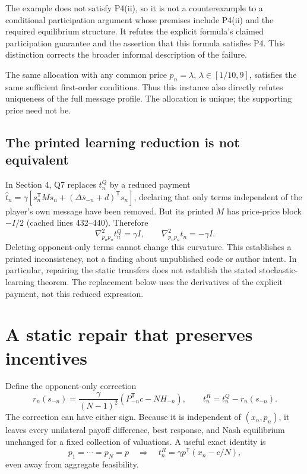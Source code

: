 \documentclass[11pt,a4paper]{article}
\begin{document}
The example does not satisfy P4(ii), so it is not a counterexample to a
conditional participation argument whose premises include P4(ii) and the
required equilibrium structure. It refutes the explicit formula's claimed
participation guarantee and the assertion that this formula satisfies P4.
This distinction corrects the broader informal description of the failure.

The same allocation with any common price $p_n=\lambda$,
$\lambda\in[1/10,9]$, satisfies the same sufficient first-order conditions.
Thus this instance also directly refutes uniqueness of the full message
profile. The allocation is unique; the supporting price need not be.

\subsection{The printed learning reduction is not equivalent}

In Section 4, Q7 replaces $t_n^Q$ by a reduced payment
$\widehat t_n=\gamma[s_n^{\mathsf T}Ms_n+
(\Delta\bar s_{-n}+d)^{\mathsf T}s_n]$, declaring that only terms
independent of the player's own message have been removed. But its printed
$M$ has price-price block $-I/2$ (cached lines 432--440). Therefore
\begin{equation}
 \nabla^2_{p_np_n}t_n^Q=\gamma I,
 \qquad
 \nabla^2_{p_np_n}\widehat t_n=-\gamma I.
 \label{eq:sign-error}
\end{equation}
Deleting opponent-only terms cannot change this curvature. This establishes
a printed inconsistency, not a finding about unpublished code or author
intent. In particular, repairing the static transfers does not establish
the stated stochastic-learning theorem. The replacement below uses the
derivatives of the explicit payment, not this reduced expression.

\section{A static repair that preserves incentives}

Define the opponent-only correction
\begin{equation}
 r_n(s_{-n})=\frac{\gamma}{(N-1)^2}
 \left(P_{-n}^{\mathsf T}c-NH_{-n}\right),
 \qquad t_n^R=t_n^Q-r_n(s_{-n}).
 \label{eq:rebate}
\end{equation}
The correction can have either sign. Because it is independent of $(x_n,p_n)$,
it leaves every unilateral payoff difference, best response, and Nash
equilibrium unchanged for a fixed collection of valuations. A useful exact
identity is
\begin{equation}
 p_1=\cdots=p_N=p
 \quad\Longrightarrow\quad
 t_n^R=\gamma p^{\mathsf T}(x_n-c/N),
 \label{eq:common-tax}
\end{equation}
even away from aggregate feasibility.
\end{document}
